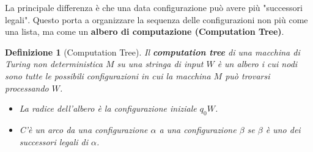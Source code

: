 \documentclass[a4paper]{article}
\newtheorem{definition}{Definizione}
\begin{document}
La principale differenza è che una data configurazione può avere più "successori legali". Questo porta a organizzare la sequenza delle configurazioni non più come una lista, ma come un \textbf{albero di computazione (Computation Tree)}.

\begin{definition}[Computation Tree]
Il \textbf{computation tree} di una macchina di Turing non deterministica $M$ su una stringa di input $W$ è un albero i cui nodi sono tutte le possibili configurazioni in cui la macchina $M$ può trovarsi processando $W$.
\begin{itemize}
    \item La radice dell'albero è la configurazione iniziale $q_0W$.
    \item C'è un arco da una configurazione $\alpha$ a una configurazione $\beta$ se $\beta$ è uno dei successori legali di $\alpha$.
\end{itemize}
\end{definition}
\end{document}
